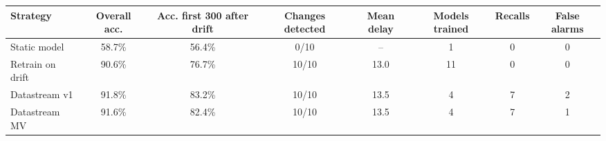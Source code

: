 \renewcommand{\arraystretch}{1.35}
\begin{tabular}{@{}lccccccc@{}}
\toprule
\textbf{Strategy} & \textbf{Overall acc.} & \textbf{Acc. first 300 after drift} & \textbf{Changes detected} & \textbf{Mean delay} & \textbf{Models trained} & \textbf{Recalls} & \textbf{False alarms}\\
\midrule
Static model & 58.7\% & 56.4\% & 0/10 & -- & 1 & 0 & 0 \\
Retrain on drift & 90.6\% & 76.7\% & 10/10 & 13.0 & 11 & 0 & 0 \\
Datastream v1 & 91.8\% & 83.2\% & 10/10 & 13.5 & 4 & 7 & 2 \\
Datastream MV & 91.6\% & 82.4\% & 10/10 & 13.5 & 4 & 7 & 1 \\
\bottomrule
\end{tabular}

